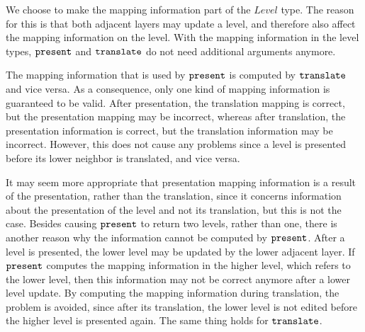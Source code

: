 

We choose to make the mapping information part of the $Level$ type. The reason for this is that both adjacent layers may update a level, and therefore also affect the mapping information on the level.  With the mapping information in the level types, ${\tt present}$ and ${\tt translate}$ do not need additional arguments anymore.
\ec

The mapping information that is used by ${\tt present}$ is computed by ${\tt translate}$ and vice versa. As a consequence, only one kind of mapping information is guaranteed to be valid. After presentation, the translation mapping is correct, but the presentation mapping may be incorrect, whereas after translation, the presentation information is correct, but the translation information may be incorrect. However, this does not cause any problems since a level is presented before its lower neighbor is translated, and vice versa. 

It may seem more appropriate that presentation mapping information is a result of the presentation, rather than the translation, since it concerns information about the presentation of the level and not its translation, but this is not the case. Besides causing ${\tt present}$ to return two levels, rather than one, there is another reason why the information cannot be computed by ${\tt present}$. After a level is presented, the lower level may be updated by the lower adjacent layer. If ${\tt present}$ computes the mapping information in the higher level, which refers to the lower level, then this information may not be correct anymore after a lower level update. By computing the mapping information during translation, the problem is avoided, since after its translation, the lower level is not edited before the higher level is presented again. The same thing holds for ${\tt translate}$.







